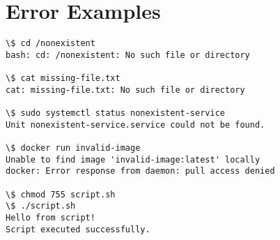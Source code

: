 \section{Error Examples}

\begin{lstlisting}[style=terminal, caption=Common Errors and Solutions]
\$ cd /nonexistent
bash: cd: /nonexistent: No such file or directory

\$ cat missing-file.txt
cat: missing-file.txt: No such file or directory

\$ sudo systemctl status nonexistent-service
Unit nonexistent-service.service could not be found.

\$ docker run invalid-image
Unable to find image 'invalid-image:latest' locally
docker: Error response from daemon: pull access denied

\$ chmod 755 script.sh
\$ ./script.sh
Hello from script!
Script executed successfully.
\end{lstlisting}